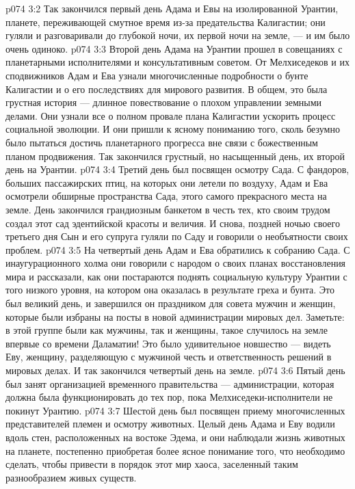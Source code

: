 \vs p074 3:2 Так закончился первый день Адама и Евы на изолированной Урантии, планете, переживающей смутное время из\hyp{}за предательства Калигастии; они гуляли и разговаривали до глубокой ночи, их первой ночи на земле, --- и им было очень одиноко.
\vs p074 3:3 \pc Второй день Адама на Урантии прошел в совещаниях с планетарными исполнителями и консультативным советом. От Мелхиседеков и их сподвижников Адам и Ева узнали многочисленные подробности о бунте Калигастии и о его последствиях для мирового развития. В общем, это была грустная история --- длинное повествование о плохом управлении земными делами. Они узнали все о полном провале плана Калигастии ускорить процесс социальной эволюции. И они пришли к ясному пониманию того, сколь безумно было пытаться достичь планетарного прогресса вне связи с божественным планом продвижения. Так закончился грустный, но насыщенный день, их второй день на Урантии.
\vs p074 3:4 \pc Третий день был посвящен осмотру Сада. С фандоров, больших пассажирских птиц, на которых они летели по воздуху, Адам и Ева осмотрели обширные пространства Сада, этого самого прекрасного места на земле. День закончился грандиозным банкетом в честь тех, кто своим трудом создал этот сад эдентийской красоты и величия. И снова, поздней ночью своего третьего дня Сын и его супруга гуляли по Саду и говорили о необъятности своих проблем.
\vs p074 3:5 \pc На четвертый день Адам и Ева обратились к собранию Сада. С инаугурационного холма они говорили с народом о своих планах восстановления мира и рассказали, как они постараются поднять социальную культуру Урантии с того низкого уровня, на котором она оказалась в результате греха и бунта. Это был великий день, и завершился он праздником для совета мужчин и женщин, которые были избраны на посты в новой администрации мировых дел. Заметьте: в этой группе были как мужчины, так и женщины, такое случилось на земле впервые со времени Даламатии! Это было удивительное новшество --- видеть Еву, женщину, разделяющую с мужчиной честь и ответственность решений в мировых делах. И так закончился четвертый день на земле.
\vs p074 3:6 \pc Пятый день был занят организацией временного правительства --- администрации, которая должна была функционировать до тех пор, пока Мелхиседеки\hyp{}исполнители не покинут Урантию.
\vs p074 3:7 \pc Шестой день был посвящен приему многочисленных представителей племен и осмотру животных. Целый день Адама и Еву водили вдоль стен, расположенных на востоке Эдема, и они наблюдали жизнь животных на планете, постепенно приобретая более ясное понимание того, что необходимо сделать, чтобы привести в порядок этот мир хаоса, заселенный таким разнообразием живых существ.
